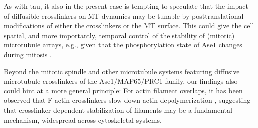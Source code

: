 As with tau, it also in the present case is tempting to speculate that the impact of diffusible crosslinkers on MT dynamics may be tunable by posttranslational modifications of either the crosslinkers or the MT surface. This could give the cell spatial, and more importantly, temporal control of the stability of (mitotic) microtubule arrays, e.g., given that the phosphorylation state of Ase1 changes during mitosis . \par

Beyond the mitotic spindle and other microtubule systems featuring diffusive microtubule crosslinkers of the Ase1/MAP65/PRC1 family, our findings also could hint at a more general principle: For actin filament overlaps, it has been observed that F-actin crosslinkers slow down actin depolymerization \parencite{maul2003eplin,schmoller2011slow}, suggesting that crosslinker-dependent stabilization of filaments may be a fundamental mechanism, widespread across cytoskeletal systems.